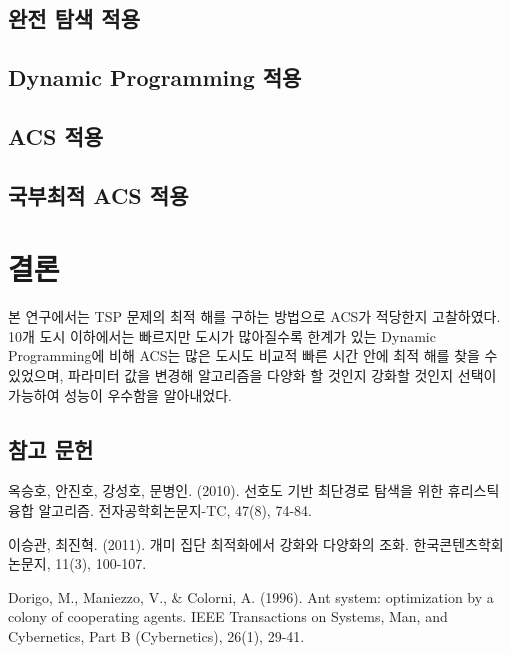 \documentclass{kcc}
\begin{document}
\subsection{완전 탐색 적용}

\subsection{Dynamic Programming 적용}

\subsection{ACS 적용}

\subsection{국부최적 ACS 적용}

\section{결론}
 본 연구에서는 TSP 문제의 최적 해를 구하는 방법으로 ACS가 적당한지 고찰하였다. 10개 도시 이하에서는 빠르지만 도시가 많아질수록 한계가 있는 Dynamic Programming에 비해 ACS는 많은 도시도 비교적 빠른 시간 안에 최적 해를 찾을 수 있었으며, 파라미터 값을 변경해 알고리즘을 다양화 할 것인지 강화할 것인지 선택이 가능하여 성능이 우수함을 알아내었다.

\subsection{참고 문헌}

옥승호, 안진호, 강성호, 문병인. (2010). 선호도 기반 최단경로 탐색을 위한 휴리스틱 융합 알고리즘. 전자공학회논문지-TC, 47(8), 74-84.

이승관, 최진혁. (2011). 개미 집단 최적화에서 강화와 다양화의 조화. 한국콘텐츠학회논문지, 11(3), 100-107.

Dorigo, M., Maniezzo, V., \& Colorni, A. (1996). Ant system: optimization by a colony of cooperating agents. IEEE Transactions on Systems, Man, and Cybernetics, Part B (Cybernetics), 26(1), 29-41.



\end{document}

